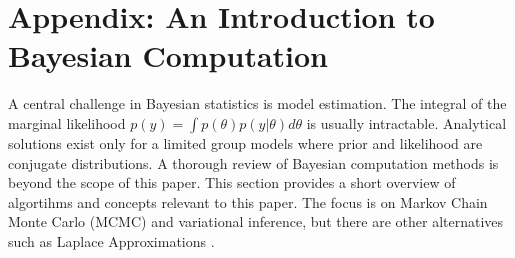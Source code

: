 \chapter{Appendix: An Introduction to Bayesian Computation}

\label{ch:computation}

A central challenge in Bayesian statistics is model estimation.
The integral of the marginal likelihood $p(y) = \int p(\theta)p(y|\theta)d\theta$ is usually intractable.
Analytical solutions exist only for a limited group models where prior and likelihood are conjugate distributions.
A thorough review of Bayesian computation methods is beyond the scope of this paper.
This section provides a short overview of algortihms and concepts relevant to this paper.
The focus is on Markov Chain Monte Carlo (MCMC) and variational inference, but there are other alternatives such as Laplace Approximations \citep{gomez-rubio_bayesian_2020}.

